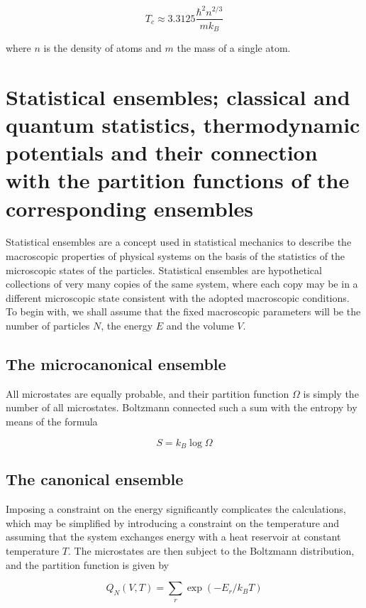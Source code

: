 \begin{equation}
    T_c \approx 3.3125 \frac{\hbar^2 n^{2/3}}{m k_B}
\end{equation}

where $n$ is the density of atoms and $m$ the mass of a single atom.

\section{Statistical ensembles; classical and quantum statistics, thermodynamic potentials and their connection with the partition functions of the corresponding ensembles}

Statistical ensembles are a concept used in statistical mechanics to describe the macroscopic properties of physical systems on the basis of the statistics of the microscopic states of the particles. Statistical ensembles are hypothetical collections of very many copies of the same system, where each copy may be in a different microscopic state consistent with the adopted macroscopic conditions. To begin with, we shall assume that the fixed macroscopic parameters will be the number of particles $N$, the energy $E$ and the volume $V$.

\subsection{The microcanonical ensemble}

All microstates are equally probable, and their partition function $\Omega$ is simply the number of all microstates. Boltzmann connected such a sum with the entropy by means of the formula

\[S=k_B \log\Omega\]

\subsection{The canonical ensemble}

Imposing a constraint on the energy significantly complicates the calculations, which may be simplified by introducing a constraint on the temperature and assuming that the system exchanges energy with a heat reservoir at constant temperature $T$. The microstates are then subject to the Boltzmann distribution, and the partition function is given by

\[Q_N(V,T) = \sum_{r}\exp\left(-E_r / k_BT\right)\]

